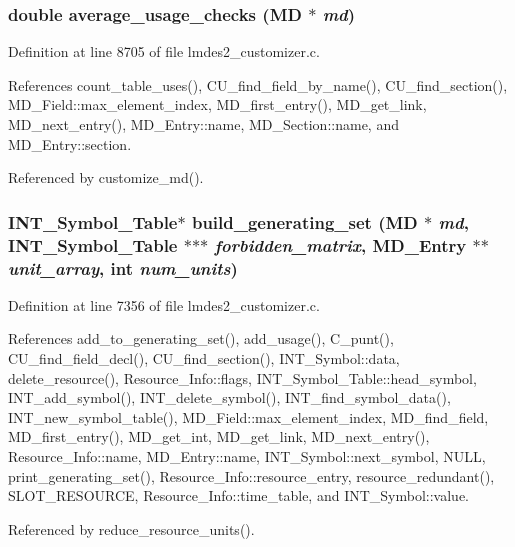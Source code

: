 \subsubsection{\setlength{\rightskip}{0pt plus 5cm}double average\_\-usage\_\-checks (\bf{MD} $\ast$ {\em md})}\label{lmdes2__customizer_8c_6eb3b2ecf46c562b81d39d54afd41f36}




Definition at line 8705 of file lmdes2\_\-customizer.c.

References count\_\-table\_\-uses(), CU\_\-find\_\-field\_\-by\_\-name(), CU\_\-find\_\-section(), MD\_\-Field::max\_\-element\_\-index, MD\_\-first\_\-entry(), MD\_\-get\_\-link, MD\_\-next\_\-entry(), MD\_\-Entry::name, MD\_\-Section::name, and MD\_\-Entry::section.

Referenced by customize\_\-md().
\subsubsection{\setlength{\rightskip}{0pt plus 5cm}\bf{INT\_\-Symbol\_\-Table}$\ast$ build\_\-generating\_\-set (\bf{MD} $\ast$ {\em md}, \bf{INT\_\-Symbol\_\-Table} $\ast$$\ast$$\ast$ {\em forbidden\_\-matrix}, \bf{MD\_\-Entry} $\ast$$\ast$ {\em unit\_\-array}, int {\em num\_\-units})}\label{lmdes2__customizer_8c_e427d30cb6d003905bbbf42b3fa712b5}




Definition at line 7356 of file lmdes2\_\-customizer.c.

References add\_\-to\_\-generating\_\-set(), add\_\-usage(), C\_\-punt(), CU\_\-find\_\-field\_\-decl(), CU\_\-find\_\-section(), INT\_\-Symbol::data, delete\_\-resource(), Resource\_\-Info::flags, INT\_\-Symbol\_\-Table::head\_\-symbol, INT\_\-add\_\-symbol(), INT\_\-delete\_\-symbol(), INT\_\-find\_\-symbol\_\-data(), INT\_\-new\_\-symbol\_\-table(), MD\_\-Field::max\_\-element\_\-index, MD\_\-find\_\-field, MD\_\-first\_\-entry(), MD\_\-get\_\-int, MD\_\-get\_\-link, MD\_\-next\_\-entry(), Resource\_\-Info::name, MD\_\-Entry::name, INT\_\-Symbol::next\_\-symbol, NULL, print\_\-generating\_\-set(), Resource\_\-Info::resource\_\-entry, resource\_\-redundant(), SLOT\_\-RESOURCE, Resource\_\-Info::time\_\-table, and INT\_\-Symbol::value.

Referenced by reduce\_\-resource\_\-units().
